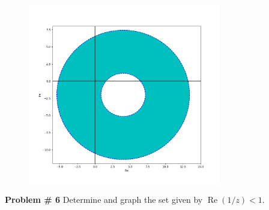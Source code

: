 \documentclass[12pt]{article}
\newcommand{\problem}[1]{\hspace{-4 ex} \large \textbf{Problem #1} }
\renewcommand{\Re}{\operatorname{Re}}
\begin{document}
	\begin{figure}[H]
		\includegraphics[width=0.75\textwidth]{hw10_figure_1}
		\centering
	\end{figure}



\bigbreak
\problem{\# 6}Determine and graph the set given by $\Re(1/z)<1$. \bigbreak
\end{document}
